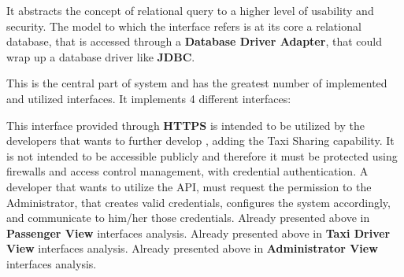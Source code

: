 \begin{itemize}
\begin{itemize}
		It abstracts the concept of relational query to a higher level of usability and security.
		The model to which the interface refers is at its core a relational database, that is accessed through a \textbf{Database Driver Adapter}, that could wrap up a database driver like \textbf{JDBC}.
	\end{itemize}
	This is the central part of \myTaxiService{} system and has the greatest number of implemented and utilized interfaces.
	It implements 4 different interfaces:
	\begin{itemize}
		 This interface provided through \textbf{HTTPS} is intended to be utilized by the developers that wants to further develop \myTaxiService{}, adding the Taxi Sharing capability.
		It is not intended to be accessible publicly and therefore it must be protected using firewalls and access control management, with credential authentication.
		A developer that wants to utilize the API, must request the permission to the Administrator, that creates valid credentials, configures the system accordingly, and communicate to him/her those credentials.
		 Already presented above in \textbf{Passenger View} interfaces analysis.
		 Already presented above in \textbf{Taxi Driver View} interfaces analysis.
		 Already presented above in \textbf{Administrator View} interfaces analysis.
	\end{itemize}
\end{itemize}
